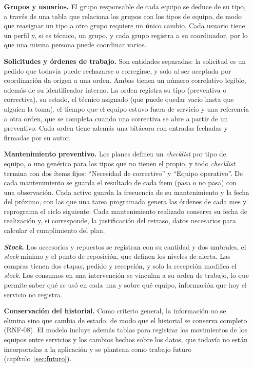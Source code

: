 \documentclass[10pt]{article}
\begin{document}
\textbf{Grupos y usuarios.} El grupo responsable de cada equipo se deduce de su tipo, a través de una tabla que relaciona los grupos con los tipos de equipo, de modo que reasignar un tipo a otro grupo requiere un único cambio. Cada usuario tiene un perfil y, si es técnico, un grupo, y cada grupo registra a su coordinador, por lo que una misma persona puede coordinar varios.

\textbf{Solicitudes y órdenes de trabajo.} Son entidades separadas: la solicitud es un pedido que todavía puede rechazarse o corregirse, y solo al ser aceptada por coordinación da origen a una orden. Ambas tienen un número correlativo legible, además de su identificador interno. La orden registra su tipo (preventiva o correctiva), su estado, el técnico asignado (que puede quedar vacío hasta que alguien la toma), el tiempo que el equipo estuvo fuera de servicio y una referencia a otra orden, que se completa cuando una correctiva se abre a partir de un preventivo. Cada orden tiene además una bitácora con entradas fechadas y firmadas por su autor.

\textbf{Mantenimiento preventivo.} Los planes definen un \textit{checklist} por tipo de equipo, o uno genérico para los tipos que no tienen el propio, y todo \textit{checklist} termina con dos ítems fijos: “Necesidad de correctivo” y “Equipo operativo”. De cada mantenimiento se guarda el resultado de cada ítem (pasa o no pasa) con una observación. Cada activo guarda la frecuencia de su mantenimiento y la fecha del próximo, con las que una tarea programada genera las órdenes de cada mes y reprograma el ciclo siguiente. Cada mantenimiento realizado conserva su fecha de realización y, si corresponde, la justificación del retraso, datos necesarios para calcular el cumplimiento del plan.

\textbf{\textit{Stock}.} Los accesorios y repuestos se registran con su cantidad y dos umbrales, el \textit{stock} mínimo y el punto de reposición, que definen los niveles de alerta. Las compras tienen dos etapas, pedido y recepción, y solo la recepción modifica el \textit{stock}. Los consumos en una intervención se vinculan a su orden de trabajo, lo que permite saber qué se usó en cada una y sobre qué equipo, información que hoy el servicio no registra.

\textbf{Conservación del historial.} Como criterio general, la información no se elimina sino que cambia de estado, de modo que el historial se conserva completo (RNF-08). El modelo incluye además tablas para registrar los movimientos de los equipos entre servicios y los cambios hechos sobre los datos, que todavía no están incorporadas a la aplicación y se plantean como trabajo futuro (capítulo~\ref{sec:futuro}).
\end{document}

